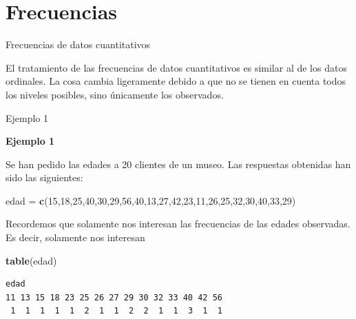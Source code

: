 \documentclass[
  ignorenonframetext,
]{beamer}
\newenvironment{Shaded}{\begin{snugshade}}{\end{snugshade}}
\newcommand{\DecValTok}[1]{\textcolor[rgb]{0.00,0.00,0.81}{#1}}
\newcommand{\KeywordTok}[1]{\textcolor[rgb]{0.13,0.29,0.53}{\textbf{#1}}}
\newcommand{\NormalTok}[1]{#1}
\newcommand{\StringTok}[1]{\textcolor[rgb]{0.31,0.60,0.02}{#1}}
\begin{document}
\hypertarget{frecuencias}{%
\section{Frecuencias}\label{frecuencias}}

\begin{frame}{Frecuencias de datos cuantitativos}
\protect\hypertarget{frecuencias-de-datos-cuantitativos}{}

El tratamiento de las frecuencias de datos cuantitativos es similar al
de los datos ordinales. La cosa cambia ligeramente debido a que no se
tienen en cuenta todos los niveles posibles, sino únicamente los
observados.

\end{frame}

\begin{frame}[fragile]{Ejemplo 1}
\protect\hypertarget{ejemplo-1}{}

\textbf{Ejemplo 1}

Se han pedido las edades a 20 clientes de un museo. Las respuestas
obtenidas han sido las siguientes:

\begin{Shaded}
\begin{Highlighting}[]
\NormalTok{edad =}\StringTok{ }\KeywordTok{c}\NormalTok{(}\DecValTok{15}\NormalTok{,}\DecValTok{18}\NormalTok{,}\DecValTok{25}\NormalTok{,}\DecValTok{40}\NormalTok{,}\DecValTok{30}\NormalTok{,}\DecValTok{29}\NormalTok{,}\DecValTok{56}\NormalTok{,}\DecValTok{40}\NormalTok{,}\DecValTok{13}\NormalTok{,}\DecValTok{27}\NormalTok{,}\DecValTok{42}\NormalTok{,}\DecValTok{23}\NormalTok{,}\DecValTok{11}\NormalTok{,}\DecValTok{26}\NormalTok{,}\DecValTok{25}\NormalTok{,}\DecValTok{32}\NormalTok{,}\DecValTok{30}\NormalTok{,}\DecValTok{40}\NormalTok{,}\DecValTok{33}\NormalTok{,}\DecValTok{29}\NormalTok{)}
\end{Highlighting}
\end{Shaded}

Recordemos que solamente nos interesan las frecuencias de las edades
observadas. Es decir, solamente nos interesan

\begin{Shaded}
\begin{Highlighting}[]
\KeywordTok{table}\NormalTok{(edad)}
\end{Highlighting}
\end{Shaded}

\begin{verbatim}
edad
11 13 15 18 23 25 26 27 29 30 32 33 40 42 56 
 1  1  1  1  1  2  1  1  2  2  1  1  3  1  1 
\end{verbatim}

\end{frame}
\end{document}
